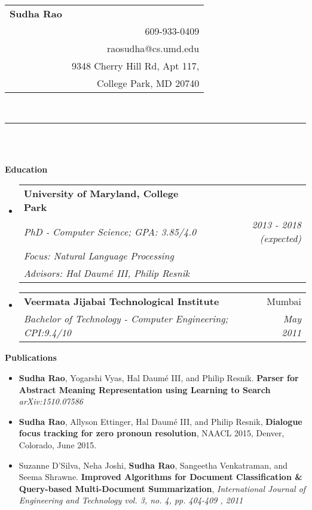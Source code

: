 \documentclass[letterpaper,12pt]{article}
\makeatletter
\newcommand{\resheading}[1]{{\large \colorbox{mygrey}{\begin{minipage}{\textwidth}{\textbf{#1 \vphantom{p\^{E}}}}\end{minipage}}}}
\newcommand{\ressubheadingnew}[6]{
\begin{tabular*}{6in}{l@{\extracolsep{\fill}}r}
		\textbf{#1} & #2 \\
		\textit{#3} & \textit{#4} \\
		\textit{#5} \\
		\textit{#6}
\end{tabular*}\vspace{-6pt}}
\newcommand{\ressubheading}[4]{
\begin{tabular*}{6in}{l@{\extracolsep{\fill}}r}
		\textbf{#1} & #2 \\
		\textit{#3} & \textit{#4} \\
\end{tabular*}\vspace{-6pt}}
\makeatother
\begin{document}
\newcommand{\myheader}{
\begin{tabular*}{6.4in}{l@{\extracolsep{\fill}}r}
	\textbf{\LARGE Sudha Rao}\\
	 & 609-933-0409\\
	 & raosudha@cs.umd.edu\\
	 & 9348 Cherry Hill Rd, Apt 117,\\
	 & College Park, MD 20740
	\end{tabular*}
\\
\vspace{0.1in}}

\myheader
\hrule
~\\
~\\
\resheading{Education}
\begin{itemize}
\item []\ressubheadingnew{University of Maryland, College Park}{}{PhD - Computer Science; GPA: 3.85/4.0}{2013 - 2018 (expected)} {Focus: Natural Language Processing}{Advisors: Hal Daum\'e III, Philip Resnik}
\item []\ressubheading{Veermata Jijabai Technological Institute}{Mumbai}{Bachelor of Technology - Computer Engineering; CPI:9.4/10}{May 2011}
\end{itemize}

\resheading{Publications}
{\footnotesize
\begin{itemize}
\item \textbf{Sudha Rao}, Yogarshi Vyas, Hal Daum\'e III, and Philip Resnik.  \textbf{Parser for Abstract Meaning Representation using Learning to Search} \textit{arXiv:1510.07586}
\item \textbf{Sudha Rao}, Allyson Ettinger, Hal Daum\'e III, and Philip Resnik, \textbf{Dialogue focus tracking for zero pronoun resolution}, NAACL 2015, Denver, Colorado, June 2015.
\item 
Suzanne D’Silva, Neha Joshi, \textbf{Sudha Rao}, Sangeetha Venkatraman, and Seema Shrawne.  {\textbf{Improved Algorithms for Document Classification \& Query-based Multi-Document Summarization}}, \textit{International Journal of Engineering and Technology vol. 3, no. 4, pp. 404-409 , 2011}
\end{itemize}
}
\end{document}
